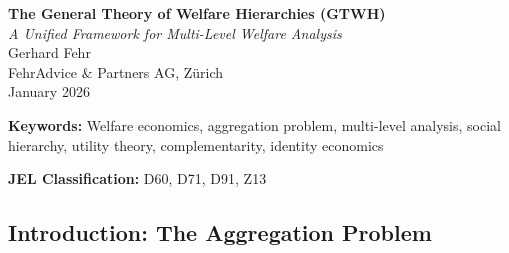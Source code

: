 \begin{center}
\Large\textbf{The General Theory of Welfare Hierarchies (GTWH)}\\[0.5em]
\large\textit{A Unified Framework for Multi-Level Welfare Analysis}\\[1em]
\normalsize
Gerhard Fehr\\
FehrAdvice \& Partners AG, Zürich\\[0.5em]
January 2026
\end{center}

\vspace{1em}

\begin{abstract}
We present the \textbf{General Theory of Welfare Hierarchies (GTWH)}, a unified 
framework that resolves the fundamental aggregation problem in welfare economics. 
The theory derives the complete structure of social levels---from individual to 
humanity---from first principles, showing that levels are \emph{endogenously 
defined} by shared identity (IDN) and collective utility (KNU) rather than 
exogenously assumed. The framework features: (1) a recursive, self-similar 
utility structure that applies identically at every level; (2) three formally 
specified inter-level dynamics (upward aggregation, downward causation, 
horizontal spillover); (3) a cross-level complementarity matrix capturing 
how levels reinforce or undermine each other; and (4) context-dependent 
level salience determined by the environment. The theory unifies methodological 
individualism with holistic approaches, bridges micro and macro analysis, 
and provides a rigorous foundation for welfare economics, social choice theory, 
and policy design across all scales of human organization.
\end{abstract}

\vspace{1em}
\noindent\textbf{Keywords:} Welfare economics, aggregation problem, multi-level 
analysis, social hierarchy, utility theory, complementarity, identity economics

\noindent\textbf{JEL Classification:} D60, D71, D91, Z13

\subsection{Introduction: The Aggregation Problem}

